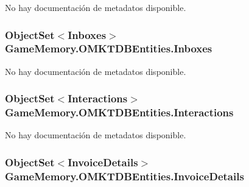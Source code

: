 No hay documentación de metadatos disponible. 

\hypertarget{class_game_memory_1_1_o_m_k_t_d_b_entities_a0097ac435c8cf12e633cba5d3416830e}{
\subsubsection[{Inboxes}]{\setlength{\rightskip}{0pt plus 5cm}Object\-Set$<${\bf Inboxes}$>$ Game\-Memory.\-O\-M\-K\-T\-D\-B\-Entities.\-Inboxes\hspace{0.3cm}{\ttfamily [get]}}}\label{class_game_memory_1_1_o_m_k_t_d_b_entities_a0097ac435c8cf12e633cba5d3416830e}


No hay documentación de metadatos disponible. 

\hypertarget{class_game_memory_1_1_o_m_k_t_d_b_entities_a90bece0c772b8feda0e88ac32ae0ac27}{
\subsubsection[{Interactions}]{\setlength{\rightskip}{0pt plus 5cm}Object\-Set$<${\bf Interactions}$>$ Game\-Memory.\-O\-M\-K\-T\-D\-B\-Entities.\-Interactions\hspace{0.3cm}{\ttfamily [get]}}}\label{class_game_memory_1_1_o_m_k_t_d_b_entities_a90bece0c772b8feda0e88ac32ae0ac27}


No hay documentación de metadatos disponible. 

\hypertarget{class_game_memory_1_1_o_m_k_t_d_b_entities_a43ee16477b00b7f5df26049a7d1f7995}{
\subsubsection[{Invoice\-Details}]{\setlength{\rightskip}{0pt plus 5cm}Object\-Set$<${\bf Invoice\-Details}$>$ Game\-Memory.\-O\-M\-K\-T\-D\-B\-Entities.\-Invoice\-Details\hspace{0.3cm}{\ttfamily [get]}}}\label{class_game_memory_1_1_o_m_k_t_d_b_entities_a43ee16477b00b7f5df26049a7d1f7995}


